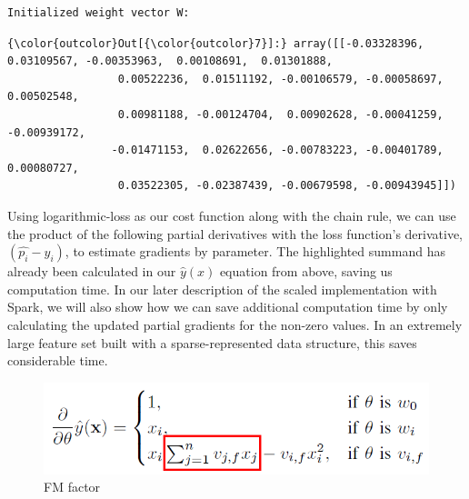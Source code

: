 \documentclass[11pt]{article}
\makeatletter
\def\maxwidth{\ifdim\Gin@nat@width>\linewidth\linewidth
    \else\Gin@nat@width\fi}
\let\Oldincludegraphics\includegraphics
\renewcommand{\includegraphics}[1]{\Oldincludegraphics[width=.8\maxwidth]{#1}}
\makeatother
\begin{document}
    \begin{Verbatim}[commandchars=\\\{\}]
Initialized weight vector W:

    \end{Verbatim}

\begin{Verbatim}[commandchars=\\\{\}]
{\color{outcolor}Out[{\color{outcolor}7}]:} array([[-0.03328396,  0.03109567, -0.00353963,  0.00108691,  0.01301888,
                 0.00522236,  0.01511192, -0.00106579, -0.00058697,  0.00502548,
                 0.00981188, -0.00124704,  0.00902628, -0.00041259, -0.00939172,
                -0.01471153,  0.02622656, -0.00783223, -0.00401789,  0.00080727,
                 0.03522305, -0.02387439, -0.00679598, -0.00943945]])
\end{Verbatim}
            
    Using logarithmic-loss as our cost function along with the chain rule,
we can use the product of the following partial derivatives with the
loss function's derivative, \((\hat{p_i} - y_i)\), to estimate gradients
by parameter. The highlighted summand has already been calculated in our
\(\hat{y}(x)\) equation from above, saving us computation time. In our
later description of the scaled implementation with Spark, we will also
show how we can save additional computation time by only calculating the
updated partial gradients for the non-zero values. In an extremely large
feature set built with a sparse-represented data structure, this saves
considerable time.

    \begin{figure}
\centering
\includegraphics{FINAL/images/FM_partials_Rendle2010.png}
\caption{FM factor}
\end{figure}
\end{document}
